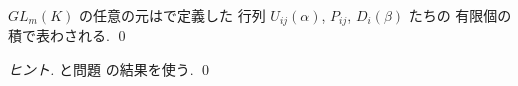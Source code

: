\documentclass[12pt,twoside]{jarticle}
\begin{document}
\begin{question}[一般線形群の生成元, 10点]
  \label{q:gen-GL}
  $GL_m(K)$ の任意の元はで定義した
  行列 $U_{ij}(\alpha)$, $P_{ij}$, $D_i(\beta)$ たちの
  有限個の積で表わされる. \qed
\end{question}

\begin{proof}[ヒント]
  と問題  の結果を使う.
  \qed
\end{proof}




%
%
\end{document}

